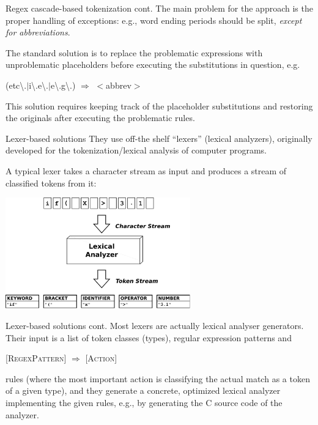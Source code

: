 \documentclass[style=upen, size=14pt]{powerdot}
\theoremstyle{definition}
\begin{document}
\begin{slide}[toc=]{Regex cascade-based tokenization cont.}
  The main problem for the approach is the proper handling of exceptions: e.g.,
  word ending periods should be split, \emph{except for abbreviations}.\bigskip

  The standard solution is to replace the problematic expressions with
  unproblematic placeholders before executing the substitutions in question, e.g.\smallskip

  \begin{center}
    (etc\textbackslash.$\vert$i\textbackslash.e\textbackslash.$\vert$e\textbackslash.g\textbackslash.)
    $\Rightarrow$ $<$abbrev$>$
  \end{center}\smallskip
  
  This solution requires keeping track of the placeholder substitutions and
  restoring the originals after executing the problematic rules.
\end{slide}

\begin{slide}[toc=Lexers]{Lexer-based solutions}
  They use off-the shelf ``lexers'' (lexical analyzers), originally developed
  for the tokenization/lexical analysis of computer programs.

  A typical lexer takes a character stream as input and produces a stream of
  classified tokens from it:

  \begin{center}
    \includegraphics[width=0.6\textwidth]{figures/lexer.eps}
  \end{center}
\end{slide}

\begin{slide}[toc=]{Lexer-based solutions cont.}
  Most lexers are actually lexical analyser generators. Their input is a list of
  token classes (types), regular expression patterns and\smallskip

  \begin{center}
    [\textsc{RegexPattern}] $\Rightarrow$ [\textsc{Action}]\smallskip
  \end{center}

rules (where the most important action is classifying the actual match as a
token of a given type), and they generate a concrete, optimized lexical analyzer
implementing the given rules, e.g., by generating the C source code of the
analyzer.
\end{slide}
\end{document}
